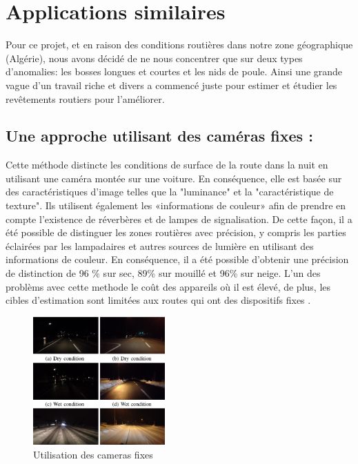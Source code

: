 \section{Applications similaires}  
Pour ce projet, et en raison des conditions routières dans notre zone géographique (Algérie), nous avons décidé de ne nous concentrer que 
sur deux types d'anomalies: les bosses longues et courtes et les nids de poule.\newline
Ainsi une grande vague d'un travail riche et divers a commencé juste pour estimer et étudier les revêtements routiers pour l'améliorer.

\subsection{Une approche utilisant des caméras fixes : }
Cette méthode \cite{kawaiMethodDistinguishRoad2012} distincte  les conditions de surface de la route dans la nuit en utilisant une caméra montée sur une voiture.
En conséquence, elle est basée sur des caractéristiques d'image telles que la "luminance" et la "caractéristique de texture". 
Ils utilisent également les «informations de couleur» afin de prendre en compte l'existence de réverbères et de lampes de signalisation. De cette façon, il a été possible de distinguer les zones routières avec précision, y compris les parties éclairées par les lampadaires et autres sources de lumière en utilisant des informations de couleur. En conséquence, il a été possible d'obtenir une précision de distinction de 96 \% sur sec, 89\% sur mouillé et 96\% sur neige.
L'un des problèms avec cette methode le coût des appareils où il est élevé, de plus, les cibles d'estimation sont limitées aux routes qui ont des dispositifs fixes .
\begin{figure}[h!]
    \center
    \includegraphics[width=0.45\textwidth]{Images/chapter1/cameraFixe.jpg}
    \caption{Utilisation des cameras fixes}
    \end{figure}
   
